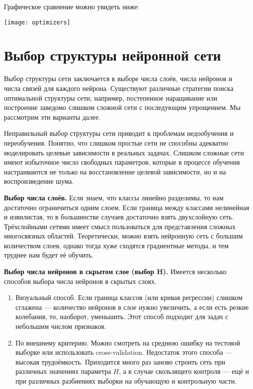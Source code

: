\documentclass{article}
\begin{document}
 	Графическое сравнение можно увидеть ниже:
		
	\begin{center}
		\begin{minipage}{0.51\linewidth}
			\centering
			\texttt{[image: optimizers]}
		\end{minipage}
	\end{center}


	\section{Выбор структуры нейронной сети}
	
	Выбор структуры сети заключается в выборе числа слоёв, числа нейронов и числа связей для каждого нейрона. Существуют различные стратегии поиска оптимальной структуры сети, например, постепенное наращивание или построение заведомо слишком сложной сети с последующим упрощением. Мы рассмотрим эти варианты далее.
	
	Неправильный выбор структуры сети приводит к проблемам недообучения и переобучения. Понятно, что слишком простые сети не способны адекватно моделировать целевые зависимости в реальных задачах. Слишком сложные сети имеют избыточное число свободных параметров, которые в процессе обучения настраиваются не только на восстановление целевой зависимости, но и на воспроизведение шума.
	
	\textbf{Выбор числа слоёв.} Если знаем, что классы линейно разделимы, то нам достаточно ограничиться одним слоем. Если граница между классами нелинейная и извилистая, то в большинстве случаев достаточно взять двухслойную сеть. Трёхслойными сетями имеет смысл пользоваться для представления сложных многосвязных областей. Теоретически, можно взять нейронную сеть с большим количеством слоев, однако тогда хуже сходятся градиентные методы, и тем труднее нам будет её обучить.
	
	\textbf{Выбор числа нейронов в скрытом слое (выбор H).} Имеется несколько способов выбора числа нейронов в скрытых слоях.
	\begin{enumerate}
		\item Визуальный способ. Если граница классов (или кривая регрессии) слишком сглажена --- количество нейронов в слое нужно увеличить, а если есть резкие колебания, то, наоборот, уменьшить. Этот способ подходит для задач с небольшим числом признаков.
		\item По внешнему критерию. Можно смотреть на среднюю ошибку на тестовой выборке или использовать cross-validation. Недостаток этого способа --- высокая трудоёмкость. Приходится много раз заново строить сеть при различных значениях параметра $H$, а в случае скользящего контроля --- ещё и при различных разбиениях выборки на обучающую и контрольную части.
	
	\end{enumerate}
	
\end{document}
